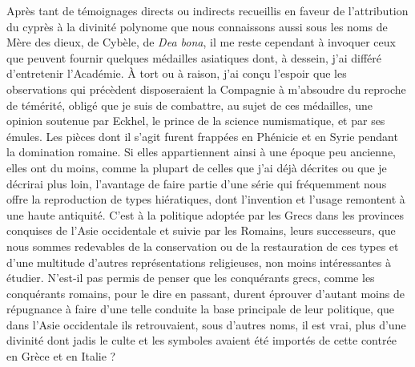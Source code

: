 \documentclass{article}
\begin{document}
Après tant de témoignages directs ou indirects recueillis en faveur de l'attribution du cyprès à la divinité polynome que nous connaissons aussi sous les noms de Mère des dieux, de Cybèle, de \emph{Dea bona}, il me reste cependant à invoquer ceux que peuvent fournir quelques médailles asiatiques dont, à dessein, j'ai différé d'entretenir l'Académie. À tort ou à raison, j'ai conçu l'espoir que les observations qui précèdent disposeraient la Compagnie à m'absoudre du reproche de témérité, obligé que je suis de combattre, au sujet de ces médailles, une opinion soutenue par Eckhel, le prince de la science numismatique, et par ses émules. Les pièces dont il s'agit furent frappées en Phénicie et en Syrie pendant la domination romaine. Si elles appartiennent ainsi à une époque peu ancienne, elles ont du moins, comme la plupart de celles que j'ai déjà décrites ou que je décrirai plus loin, l'avantage de faire partie d'une série qui fréquemment nous offre la reproduction de types hiératiques, dont l'invention et l'usage remontent à une haute antiquité. C'est à la politique adoptée par les Grecs dans les provinces conquises de l'Asie occidentale et suivie par les Romains, leurs successeurs, que nous sommes redevables de la conservation ou de la restauration de ces types et d'une multitude d'autres représentations religieuses, non moins intéressantes à étudier. N'est-il pas permis de penser que les conquérants grecs, comme les conquérants romains, pour le dire en passant, durent éprouver d'autant moins de répugnance à faire d'une telle conduite la base principale de leur politique, que dans l'Asie occidentale ils retrouvaient, sous d'autres noms, il est vrai, plus d'une divinité dont jadis le culte et les symboles avaient été importés de cette contrée en Grèce et en Italie ?
\end{document}
